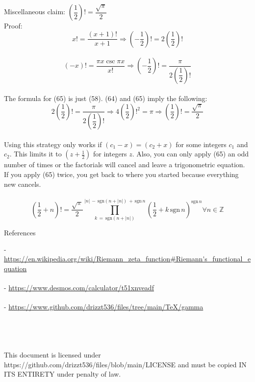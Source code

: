 \documentclass[12pt]{article}
\begin{document}
\begin{section}{Miscellaneous}
	\noindent claim: $\left(\dfrac12\right)!=\dfrac{\sqrt\pi}2$\\
	Proof:\\
	\begin{equation}
		x!=\dfrac{(x+1)!}{x+1}\Longrightarrow\left(-\dfrac12\right)!=2\left(\dfrac12\right)!
	\end{equation}\\
	\begin{equation}
		(-x)!=\dfrac{\pi x\csc\pi x}{x!}\Longrightarrow\left(-\dfrac12\right)!=\dfrac\pi{2\left(\dfrac12\right)!}
	\end{equation}\\
	The formula for (65) is just (58). (64) and (65) imply the following:\\
	\begin{equation}
		2\left(\dfrac12\right)!=\dfrac\pi{2\left(\dfrac12\right)!}\Longrightarrow4\left(\dfrac12\right)!^2=\pi\Longrightarrow\left(\dfrac12\right)!=\dfrac{\sqrt\pi}2
	\end{equation}\\
	Using this strategy only works if $(c_1-x)=(c_2+x)$ for some integers $c_1$ and $c_2$. This limits it to $(z+\frac12)$ for integers $z$. Also, you can only apply (65) an odd number of times or the factorials will cancel and leave a trigonometric equation. If you apply (65) twice, you get back to where you started because everything new cancels.\\
	\blacksquare\\

	\noindent\begin{equation}
		\left(\dfrac12+n\right)!=\dfrac{\sqrt\pi}2\prod_{k\,=\,\text{sgn}\left(n+\left|n\right|\right)}^{\left|n\right|\,-\,\text{sgn}\left(n+\left|n\right|\right)\,+\,\text{sgn}\,n}\left(\dfrac12+k\,\text{sgn}\,n\right)^{\text{sgn}\,n}\forall n\in\mathbb Z
	\end{equation}
\end{section}

\pagebreak\begin{section}{References}

	\noindent- \url{https://en.wikipedia.org/wiki/Riemann\_zeta\_function\#Riemann's\_functional\_equation}\\
	\indent{}\\

	\noindent- \url{https://www.desmos.com/calculator/t51xnveadf}\\
	\indent{}\\

	\noindent- \url{https://www.github.com/drizzt536/files/tree/main/TeX/gamma}\\
	\indent{}
	\\
	\\
	\\
	\\
	This document is licensed under https://github.com/drizzt536/files/blob/main/LICENSE
	and must be copied IN ITS ENTIRETY under penalty of law.
\end{section}
\end{document}
